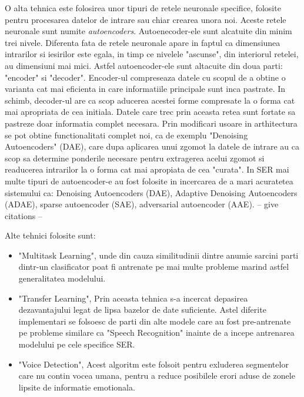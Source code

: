 \documentclass[a4paper,12pt, twoside]{book}
\begin{document}
						O alta tehnica este folosirea unor tipuri de retele neuronale specifice, folosite pentru procesarea datelor de intrare sau chiar crearea unora noi. Aceste retele neuronale sunt numite \textit{autoencoders}. Autoenecoder-ele sunt alcatuite din minim trei nivele. Diferenta fata de retele neuronale apare in faptul ca dimensiunea intrarilor si iesirilor este egala, in timp ce nivelele "ascunse", din interiorul retelei, au dimensiuni mai mici. Astfel autoencoder-ele sunt altacuite din doua parti: "encoder" si "decoder". Encoder-ul compreseaza datele cu scopul de a obtine o varianta cat mai eficienta in care informatiile principale sunt inca pastrate. In schimb, decoder-ul are ca scop aducerea acestei forme compresate la o forma cat mai apropriata de cea initiala. Datele care trec prin aceasta retea sunt fortate sa pastreze doar informatia complet necesara. Prin modificari usoare in arthitectura se pot obtine functionalitati complet noi, ca de exemplu "Denoising Autoencoders" (DAE), care dupa aplicarea unui zgomot la datele de intrare au ca scop sa determine ponderile necesare pentru extragerea acelui zgomot si readucerea intrarilor la o forma cat mai apropiata de cea "curata". In SER mai multe tipuri de autoencoder-e au fost folosite in incercarea de a mari acuratetea sistemului ca: Denoising Autoencoders (DAE), Adaptive Denoising Autoencoders (ADAE), sparse autoencoder (SAE), adversarial autoencoder (AAE). -- give citations -- \par
						
						Alte tehnici folosite sunt:
						\begin{itemize}
							\item  "Multitask Learning", unde din cauza similitudinii dintre anumie sarcini parti dintr-un clasificator poat fi antrenate pe mai multe probleme marind astfel generalitatea modelului.
							\item "Transfer Learning", Prin aceasta tehnica s-a incercat depasirea dezavantajului legat de lipsa bazelor de date suficiente. Astel diferite implementari se folsoesc de parti din alte modele care au fost pre-antrenate pe probleme similare ca "Speech Recognition" inainte de a incepe antrenarea modelului pe cele specifice SER.
							\item "Voice Detection", Acest algoritm este folsoit pentru exluderea segmentelor care nu contin vocea umana, pentru a reduce posibilele erori aduse de zonele lipsite de informatie emotionala. 						
					\end{itemize}
				
\end{document}
